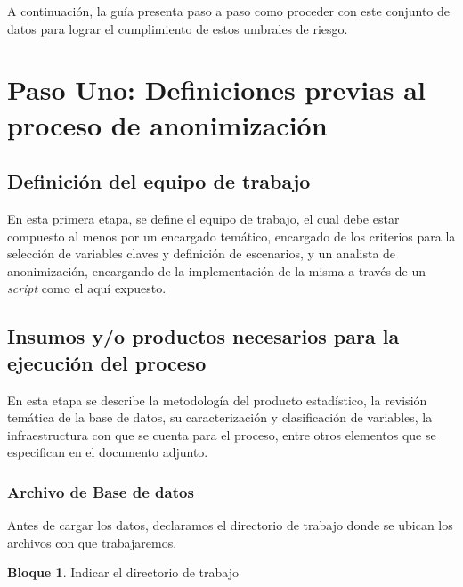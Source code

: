 \documentclass[]{book}
\theoremstyle{definition}
\theoremstyle{definition}
\newtheorem{example}{Bloque}[chapter]
\theoremstyle{definition}
\theoremstyle{definition}
\theoremstyle{remark}
\begin{document}
A continuación, la guía presenta paso a paso como proceder con este conjunto de datos para lograr el cumplimiento de estos umbrales de riesgo.

\hypertarget{paso-uno-definiciones-previas-al-proceso-de-anonimizaciuxf3n}{%
\section{Paso Uno: Definiciones previas al proceso de anonimización}\label{paso-uno-definiciones-previas-al-proceso-de-anonimizaciuxf3n}}

\hypertarget{definiciuxf3n-del-equipo-de-trabajo}{%
\subsection{Definición del equipo de trabajo}\label{definiciuxf3n-del-equipo-de-trabajo}}

En esta primera etapa, se define el equipo de trabajo, el cual debe estar compuesto al menos por un encargado temático, encargado de los criterios para la selección de variables claves y definición de escenarios, y un analista de anonimización, encargando de la implementación de la misma a través de un \emph{script} como el aquí expuesto.

\hypertarget{insumos-yo-productos-necesarios-para-la-ejecuciuxf3n-del-proceso}{%
\subsection{Insumos y/o productos necesarios para la ejecución del proceso}\label{insumos-yo-productos-necesarios-para-la-ejecuciuxf3n-del-proceso}}

En esta etapa se describe la metodología del producto estadístico, la revisión temática de la base de datos, su caracterización y clasificación de variables, la infraestructura con que se cuenta para el proceso, entre otros elementos que se especifican en el documento adjunto.

\hypertarget{archivo-de-base-de-datos}{%
\subsubsection{Archivo de Base de datos}\label{archivo-de-base-de-datos}}

Antes de cargar los datos, declaramos el directorio de trabajo donde se ubican los archivos con que trabajaremos.

\begin{example}
\protect\hypertarget{exm:bloque1nbm}{}{\label{exm:bloque1nbm} }Indicar el directorio de trabajo
\end{example}
\end{document}
